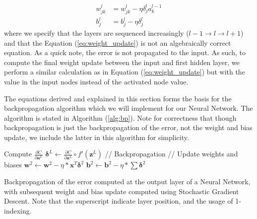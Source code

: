 \documentclass
[twocolumn,
secnumarabic,
nobibnotes,
aps,
prl,
reprint,
groupedaddress,
amsmath,
amssymb
]{revtex4-2}
\begin{document}
\begin{equation}
  \begin{aligned}
    \label{eq:weight_update}
    w_{jk}^l & = w_{jk}^l - \eta\delta_j^la_k^{l-1} \\
    b_j^l    & = b_j^l - \eta\delta_j^l
  \end{aligned}
\end{equation}
where we specify that the layers are sequenced increasingly ($l-1 \rightarrow l \rightarrow l+1$) and that the Equation (\ref{eq:weight_update}) is not an algebraically correct equation. As a quick note, the error is not propagated to the input. As such, to compute the final weight update between the input and first hidden layer, we perform a similar calculation as in Equation (\ref{eq:weight_update}) but with the value in the input nodes instead of the activated node value.

The equations derived and explained in this section forms the basis for the backpropagation algorithm which we will implement for our Neural Network. The algorithm is stated in Algorithm (\ref{alg:bp}). Note for correctness that though backpropagation is just the backpropagation of the error, not the weight and bias update, we include the latter in this algorithm for simplicity.

\begin{algorithm}
  Compute $\frac{\partial{C}}{\partial{\bm{a}^L}}$\;
  $\bm{\delta}^L \leftarrow \frac{\partial{C}}{\partial{\bm{a}^L}} \circ f'(\bm{z}^L)$\;
  // Backpropagation\;
  // Update weights and biases\;
  $\bm{w}^2 \leftarrow \bm{w}^2 - \eta * \bm{x}^T\bm{\delta}^2$\;
  $\bm{b}^2 \leftarrow \bm{b}^2 - \eta * \sum{\bm{\delta}^2}$\;
  \caption{\label{alg:bp}Backpropagation of the error computed at the output layer of a Neural Network, with subsequent weight and bias update computed using Stochastic Gradient Descent. Note that the superscript indicate layer position, and the usage of 1-indexing.}
\end{algorithm}
\end{document}
